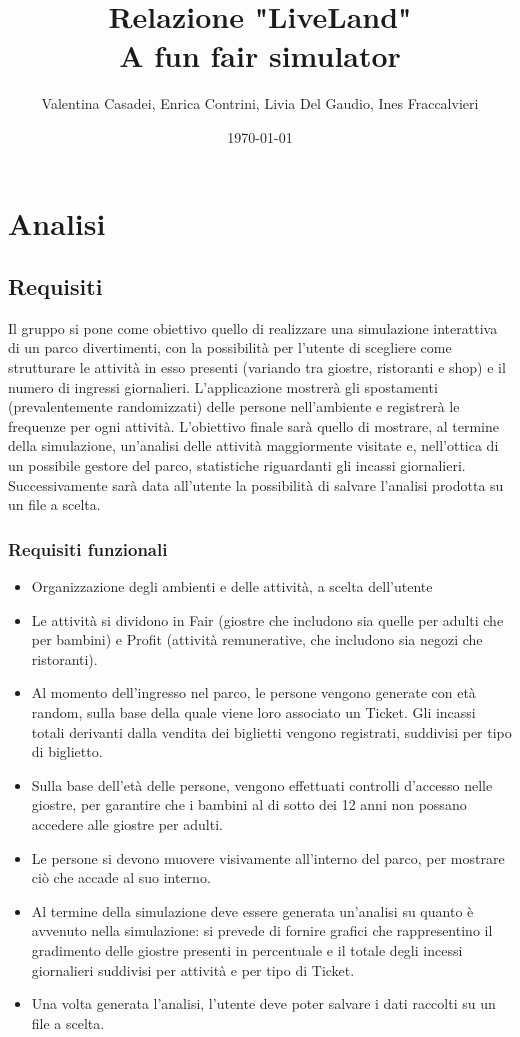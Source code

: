 \documentclass[a4paper,12pt]{report}
\title{Relazione "LiveLand" \\A fun fair simulator}
\author{Valentina Casadei, Enrica Contrini, Livia Del Gaudio, Ines Fraccalvieri}
\date{\today}
\begin{document}
\maketitle
\tableofcontents

\chapter{Analisi}

\section{Requisiti}

Il gruppo si pone come obiettivo quello di realizzare una simulazione interattiva di un parco divertimenti, con la possibilità per l’utente di scegliere come strutturare le attività in esso presenti (variando tra giostre, ristoranti e shop) e il numero di ingressi giornalieri. 
L’applicazione mostrerà gli spostamenti (prevalentemente randomizzati) delle persone nell’ambiente e registrerà le frequenze per ogni attività. L’obiettivo finale sarà quello di mostrare, al termine della simulazione, un’analisi delle attività maggiormente visitate e, nell’ottica di un possibile gestore del parco, statistiche riguardanti gli incassi giornalieri. Successivamente sarà data all'utente la possibilità di salvare l'analisi prodotta su un file a scelta.

\subsection*{Requisiti funzionali}
\begin{itemize}
	\item Organizzazione degli ambienti e delle attività, a scelta dell'utente
	\item Le attività si dividono in Fair (giostre che includono sia quelle per adulti che per bambini) e Profit (attività remunerative, che includono sia negozi che ristoranti).
	\item Al momento dell'ingresso nel parco, le persone vengono generate con età random, sulla base della quale viene loro associato un Ticket. Gli incassi totali derivanti dalla vendita dei biglietti vengono registrati, suddivisi per tipo di biglietto. 
	\item Sulla base dell'età delle persone, vengono effettuati controlli d'accesso nelle giostre, per garantire che i bambini al di sotto dei 12 anni non possano accedere alle giostre per adulti.
	\item Le persone si devono muovere visivamente all'interno del parco, per mostrare ciò che accade al suo interno.
	\item Al termine della simulazione deve essere generata un'analisi su quanto è avvenuto nella simulazione: si prevede di fornire grafici che rappresentino il gradimento delle giostre presenti in percentuale e il totale degli incessi giornalieri suddivisi per attività e per tipo di Ticket.
	\item Una volta generata l'analisi, l'utente deve poter salvare i dati raccolti su un file a scelta.
\end{itemize}
\end{document}
